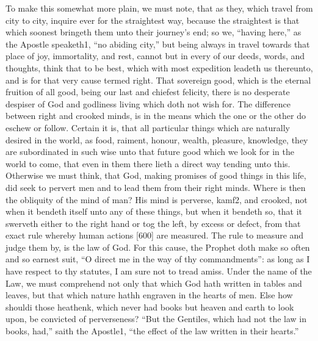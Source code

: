 To make this somewhat more plain, we must note, that as they, which travel from city to city, inquire ever for the straightest way, because the straightest is that which soonest bringeth them unto their journey’s end; so we, “having here,” as the Apostle speaketh1, “no abiding city,” but being always in travel towards that place of joy, immortality, and rest, cannot but in every of our deeds, words, and thoughts, think that to be best, which with most expedition leadeth us thereunto, and is for that very cause termed right. That sovereign good, which is the eternal fruition of all good, being our last and chiefest felicity, there is no desperate despiser of God and godliness living which doth not wish for. The difference between right and crooked minds, is in the means which the one or the other do eschew or follow. Certain it is, that all particular things which are naturally desired in the world, as food, raiment, honour, wealth, pleasure, knowledge, they are subordinated in such wise unto that future good which we look for in the world to come, that even in them there lieth a direct way tending unto this. Otherwise we must think, that God, making promises of good things in this life, did seek to pervert men and to lead them from their right minds. Where is then the obliquity of the mind of man? His mind is perverse, kamf2, and crooked, not when it bendeth itself unto any of these things, but when it bendeth so, that it swerveth either to the right hand or tog the left, by excess or defect, from that exact rule whereby human actions [600] are measured. The rule to measure and judge them by, is the law of God. For this cause, the Prophet doth make so often and so earnest suit, “O direct me in the way of thy commandments”: as long as I have respect to thy statutes, I am sure not to tread amiss. Under the name of the Law, we must comprehend not only that which God hath written in tables and leaves, but that which nature hathh engraven in the hearts of men. Else how shouldi those heathenk, which never had books but heaven and earth to look upon, be convicted of perverseness? “But the Gentiles, which had not the law in books, had,” saith the Apostle1, “the effect of the law written in their hearts.”

